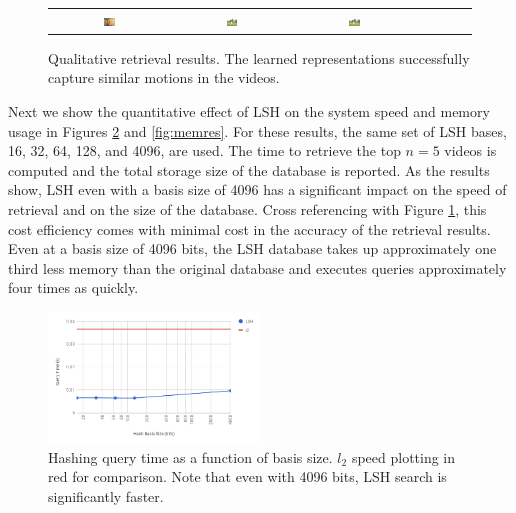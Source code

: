\begin{figure}[t]
\begin{center}
\begin{tabular}{c|c|ccccc}
          \includegraphics[width=0.1\textwidth]{images/ret_results/writing/64.png} & 
          \includegraphics[width=0.1\textwidth]{images/ret_results/writing/128.png} & 
          \includegraphics[width=0.1\textwidth]{images/ret_results/writing/4096.png}            
        \end{tabular}
        \caption{Qualitative retrieval results. The learned representations successfully capture similar motions in the videos.}
        \label{fig:retres}
    \end{center}
\end{figure}

Next we show the quantitative effect of LSH on the system speed and memory usage in Figures \ref{fig:speedres} and \ref{fig:memres}. For these results, the same set of LSH bases, 16, 32, 64, 128, and 4096, are used. The time to retrieve the top $n=5$ videos is computed and the total storage size of the database is reported. As the results show, LSH even with a basis size of 4096 has a significant impact on the speed of retrieval and on the size of the database. Cross referencing with Figure \ref{fig:retres}, this cost efficiency comes with minimal cost in the accuracy of the retrieval results. Even at a basis size of 4096 bits, the LSH database takes up approximately one third less memory than the original database and executes queries approximately four times as quickly.

\begin{figure}[h!]
    \centering
    \includegraphics[width=0.5\textwidth]{images/hashing_time_results.png}
    \caption{Hashing query time as a function of basis size. $l_2$ speed plotting in red for comparison. Note that even with 4096 bits, LSH search is significantly faster.}
    \label{fig:speedres}
\end{figure}

